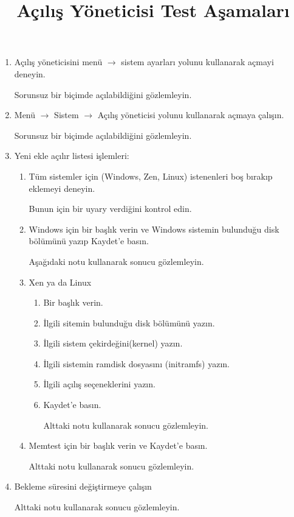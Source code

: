 \documentclass[a4paper,10pt]{article}
\title{Açılış Yöneticisi Test Aşamaları}
\begin{document}
\maketitle

\begin{enumerate}
    \item Açılış yöneticisini menü $\rightarrow$ sistem ayarları yolunu kullanarak açmayi deneyin.

    Sorunsuz bir biçimde açılabildiğini gözlemleyin.
    \item Menü $\rightarrow$ Sistem $\rightarrow$ Açılış yöneticisi yolunu kullanarak açmaya çalışın.

    Sorunsuz bir biçimde açılabildiğini gözlemleyin.
    \item Yeni ekle açılır listesi işlemleri:
    \begin{enumerate}
        \item Tüm sistemler için (Windows, Zen, Linux) istenenleri boş bırakıp eklemeyi deneyin.
    
	 Bunun için bir uyary verdiğini kontrol edin.

        \item Windows için bir başlık verin ve Windows sistemin bulunduğu disk bölümünü yazıp Kaydet'e basın.

            Aşağıdaki notu kullanarak sonucu gözlemleyin.


\item Xen ya da Linux 
\begin{enumerate}
    \item Bir başlık verin.
    \item İlgili sitemin bulunduğu disk bölümünü yazın.
    \item İlgili sistem çekirdeğini(kernel) yazın.
    \item İlgili sistemin ramdisk dosyasını (initramfs) yazın.
    \item İlgili açılış seçeneklerini yazın.
    \item Kaydet'e basın.

          Alttaki notu kullanarak sonucu gözlemleyin.

\end{enumerate}

\item Memtest için bir başlık verin ve Kaydet'e basın.

    Alttaki notu kullanarak sonucu gözlemleyin.

    \end{enumerate}
\item Bekleme süresini değiştirmeye çalışın 

  Alttaki notu kullanarak sonucu gözlemleyin.
\end{enumerate}
\end{document}

